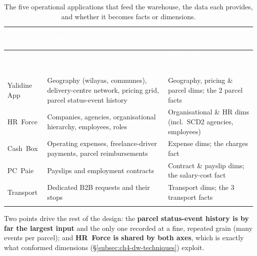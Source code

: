 \begingroup
\renewcommand{\arraystretch}{1.35}
\begin{xltabular}{\linewidth}{|>{\raggedright\arraybackslash}p{2.1cm}|>{\raggedright\arraybackslash}X|>{\raggedright\arraybackslash}p{2.9cm}|}
\caption{The five operational applications that feed the warehouse, the data each provides, and whether
it becomes facts or dimensions.}
\label{tab:ch4-dw-sources} \\
\hline
{}
\textcolor{white}{\textbf{Source}} & \textcolor{white}{\textbf{Data it provides}} &
\textcolor{white}{\textbf{Feeds (facts / dimensions)}} \\
\hline
\endfirsthead
\hline
{}
\textcolor{white}{\textbf{Source}} & \textcolor{white}{\textbf{Data it provides}} &
\textcolor{white}{\textbf{Feeds (facts / dimensions)}} \\
\hline
\endhead
\hline
{} \\
\endfoot
\endlastfoot
Yalidine App & Geography (wilayas, communes), delivery-centre network, pricing grid, parcel
status-event history & Geography, pricing \& parcel dims; the 2 parcel facts \\
HR~Force & Companies, agencies, organisational hierarchy, employees, roles & Organisational \& HR dims
(incl.\ SCD2 agencies, employees) \\
Cash~Box & Operating expenses, freelance-driver payments, parcel reimbursements & Expense dims; the
charges fact \\
PC~Paie & Payslips and employment contracts & Contract \& payslip dims; the salary-cost fact \\
Transport & Dedicated B2B requests and their stops & Transport dims; the 3 transport facts \\
\hline
{}
 \\
\hline
\end{xltabular}
\endgroup

Two points drive the rest of the design: the \textbf{parcel status-event history is by far the largest
input} and the only one recorded at a fine, repeated grain (many events per parcel); and
\textbf{HR~Force is shared by both axes}, which is exactly what conformed dimensions
(\S\ref{subsec:ch4-dw-techniques}) exploit.

